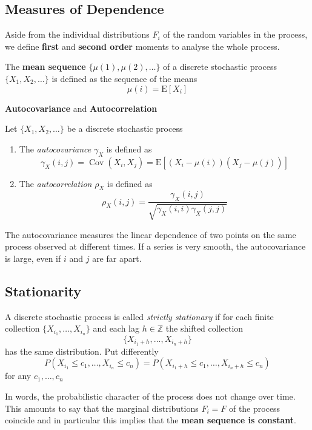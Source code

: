 \documentclass[11pt]{article}
\theoremstyle{definition}
\newcommand*\ev[1]{\mathrel{\text{E}\left[#1\right]}}
\newcommand*\Z{\mathbb{Z}}
\newcommand*\Cov[1]{\mathop{\text{Cov}}\left(#1\right)}
\begin{document}
\subsection{Measures of Dependence}
Aside from the individual distributions $F_i$ of the random variables in the process, we define \textbf{first} and \textbf{second order} moments to analyse the whole process.
\begin{definition}
	The \textbf{mean sequence} $\{\mu(1),\mu(2), \dots\}$ of a discrete stochastic process\\
	$\{X_1, X_2, \dots\}$ is defined as the sequence of the means
	\begin{equation*}
		\mu(i) = \ev{X_i}
	\end{equation*}
\end{definition}

\noindent
\textbf{Autocovariance} and \textbf{Autocorrelation}
\begin{definition}
	Let $\{X_1, X_2, \dots\}$ be a discrete stochastic process
	\begin{enumerate}
		\item The \emph{autocovariance} $\gamma_X$ is defined as
		\begin{equation*}
			\gamma_X(i,j) = \Cov{X_i,X_j} = \ev{(X_i - \mu(i))(X_j - \mu(j))}
		\end{equation*}
		\item The \emph{autocorrelation} $\rho_X$ is defined as
		\begin{equation*}
			\rho_X(i,j) = \frac{\gamma_X(i,j)}{\sqrt{\gamma_X(i,i)\gamma_X(j,j)}}
		\end{equation*}
	\end{enumerate}
\end{definition}
The autocovariance measures the linear dependence of two points on the same process observed at different times. If a series is very smooth, the autocovariance is large, even if $i$ and $j$ are far apart.

\clearpage
\subsection{Stationarity}
\begin{definition}
	A discrete stochastic process is called \emph{strictly stationary} if for each finite collection $\{X_{i_1}, \dots, X_{i_n}\}$ and each lag $h\in\Z$ the shifted collection
	\begin{equation*}
		\{X_{i_1+h}, \dots, X_{i_n+h}\}
	\end{equation*}
	has the same distribution. Put differently
	\begin{equation*}
		P(X_{i_1}\leq c_1, \dots, X_{i_n}\leq c_n) = P(X_{i_1+h}\leq c_1, \dots, X_{i_n+h}\leq c_n)
	\end{equation*}
	for any $c_1,\dots,c_n$
\end{definition}
In words, the probabilistic character of the process does not change over time. This amounts to say that the marginal distributions $F_i = F$ of the process coincide and in particular this implies that the \textbf{mean sequence is constant}.
\end{document}
